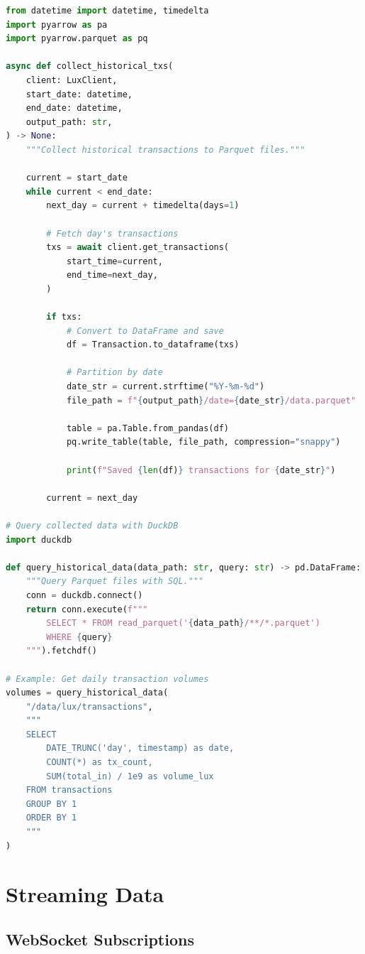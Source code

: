 \documentclass[11pt,twocolumn]{article}
\begin{document}
\begin{lstlisting}[language=Python,caption=Historical Collection]
from datetime import datetime, timedelta
import pyarrow as pa
import pyarrow.parquet as pq

async def collect_historical_txs(
    client: LuxClient,
    start_date: datetime,
    end_date: datetime,
    output_path: str,
) -> None:
    """Collect historical transactions to Parquet files."""

    current = start_date
    while current < end_date:
        next_day = current + timedelta(days=1)

        # Fetch day's transactions
        txs = await client.get_transactions(
            start_time=current,
            end_time=next_day,
        )

        if txs:
            # Convert to DataFrame and save
            df = Transaction.to_dataframe(txs)

            # Partition by date
            date_str = current.strftime("%Y-%m-%d")
            file_path = f"{output_path}/date={date_str}/data.parquet"

            table = pa.Table.from_pandas(df)
            pq.write_table(table, file_path, compression="snappy")

            print(f"Saved {len(df)} transactions for {date_str}")

        current = next_day

# Query collected data with DuckDB
import duckdb

def query_historical_data(data_path: str, query: str) -> pd.DataFrame:
    """Query Parquet files with SQL."""
    conn = duckdb.connect()
    return conn.execute(f"""
        SELECT * FROM read_parquet('{data_path}/**/*.parquet')
        WHERE {query}
    """).fetchdf()

# Example: Get daily transaction volumes
volumes = query_historical_data(
    "/data/lux/transactions",
    """
    SELECT
        DATE_TRUNC('day', timestamp) as date,
        COUNT(*) as tx_count,
        SUM(total_in) / 1e9 as volume_lux
    FROM transactions
    GROUP BY 1
    ORDER BY 1
    """
)
\end{lstlisting}

\section{Streaming Data}

\subsection{WebSocket Subscriptions}
\end{document}

